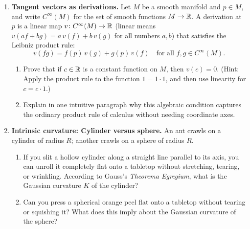 \begin{enumerate}
\begin{enumerate}
    \item Is $\tau_{12}$ differentiable at the origin $x = 0$?
    \item Does the collection of these two charts form a valid smooth atlas for $\R$? Explain why or why not.
  \end{enumerate}
  \item \textbf{Tangent vectors as derivations.} Let $M$ be a smooth manifold and $p \in M$, and write $C^\infty(M)$ for the set of smooth functions $M \to \mathbb{R}$. A derivation at $p$ is a linear map $v \colon C^\infty(M) \to \mathbb{R}$ (linear means $v(af + bg) = a\,v(f) + b\,v(g)$ for all numbers $a, b$) that satisfies the Leibniz product rule:
  \[
  v(fg) = f(p)\,v(g) + g(p)\,v(f) \quad \text{for all } f, g \in C^\infty(M).
  \]
  \begin{enumerate}
    \item Prove that if $c \in \mathbb{R}$ is a constant function on $M$, then $v(c) = 0$. (Hint: Apply the product rule to the function $1 = 1 \cdot 1$, and then use linearity for $c = c \cdot 1$.)
    \item Explain in one intuitive paragraph why this algebraic condition captures the ordinary product rule of calculus without needing coordinate axes.
  \end{enumerate}
  \item \textbf{Intrinsic curvature: Cylinder versus sphere.} An ant crawls on a cylinder of radius $R$; another crawls on a sphere of radius $R$.
  \begin{enumerate}
    \item If you slit a hollow cylinder along a straight line parallel to its axis, you can unroll it completely flat onto a tabletop without stretching, tearing, or wrinkling. According to Gauss's \emph{Theorema Egregium}, what is the Gaussian curvature $K$ of the cylinder?
    \item Can you press a spherical orange peel flat onto a tabletop without tearing or squishing it? What does this imply about the Gaussian curvature of the sphere?
  \end{enumerate}
\end{enumerate}

\newpage
